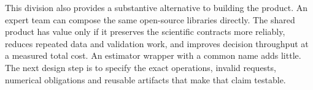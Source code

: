 This division also provides a substantive alternative to building the
product. An expert team can compose the same open-source libraries directly.
The shared product has value only if it preserves the scientific contracts
more reliably, reduces repeated data and validation work, and improves
decision throughput at a measured total cost. An estimator wrapper with
a common name adds little. The next design step is to specify the exact
operations, invalid requests, numerical obligations and reusable artifacts
that make that claim testable.

